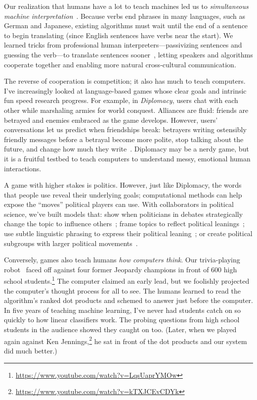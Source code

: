 \documentclass[11pt]{amsart}
\begin{document}

Our realization that humans have a lot to teach machines led us to
\emph{simultaneous machine
  interpretation}~\cite{Grissom:He:Boyd-Graber:Morgan-2014}. Because verbs end
phrases in many languages, such as German and Japanese, existing algorithms must
wait until the end of a sentence to begin translating (since English sentences
have verbs near the start). We learned tricks from professional human
interpreters---passivizing sentences and guessing the verb---to translate
sentences sooner~\cite{He-15}, letting speakers and algorithms cooperate together and
enabling more natural cross-cultural communication.

The reverse of cooperation is competition; it also has much to teach
computers. I've increasingly looked at language-based games whose clear goals
and intrinsic fun speed research progress.  For example, in \emph{Diplomacy},
users chat with each other while marshaling armies for world conquest.
Alliances are fluid: friends are betrayed and enemies embraced as the game
develops. However, users' conversations let us predict when friendships break:
betrayers writing ostensibly friendly messages before a betrayal become more
polite, stop talking about the future, and change how much they
write~\cite{niculae-15}.  Diplomacy may be a nerdy game, but it is a fruitful
testbed to teach computers to understand messy, emotional human interactions.

A game with higher stakes is politics.  However, just like Diplomacy, the words
that people use reveal their underlying goals; computational methods can help
expose the ``moves'' political players can use.  With collaborators in political
science, we've built models that: show when politicians in debates strategically
change the topic to influence others~\cite{nguyen-12,Nguyen-14b}; frame topics
to reflect political leanings~\cite{nguyen-13:shlda}; use subtle linguistic
phrasing to express their political leaning~\cite{iyyer-14a}; or create
political subgroups with larger political
movements~\cite{Nguyen:Boyd-Graber:Resnik:Miler-2015}.

Conversely, games also teach humans \emph{how computers think}.  Our
trivia-playing robot~\cite{boyd-graber-12,iyyer-14b,iyyer-15} faced off against
four former Jeopardy champions in front of 600 high school
students.\footnote{\url{https://www.youtube.com/watch?v=LqsUaprYMOw}} The
computer claimed an early lead, but we foolishly projected the computer's
thought process for all to see.  The humans learned to read the algorithm's
ranked dot products and schemed to answer just before the computer. In five
years of teaching machine learning, I've never had students catch on so quickly
to how linear classifiers work.  The probing questions from high school students
in the audience showed they caught on too.  (Later, when we played again against
Ken Jennings,\footnote{\url{https://www.youtube.com/watch?v=kTXJCEvCDYk}} he sat
in front of the dot products and our system did much better.)
\end{document}
